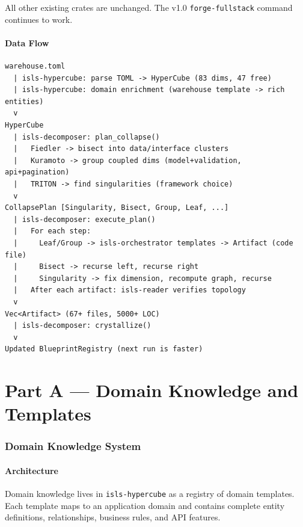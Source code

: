 \documentclass[11pt,a4paper]{article}
\begin{document}
All other existing crates are unchanged. The v1.0 \texttt{forge-fullstack}
command continues to work.

\subsection{Data Flow}

\begin{lstlisting}[title=End-to-End Flow]
warehouse.toml
  | isls-hypercube: parse TOML -> HyperCube (83 dims, 47 free)
  | isls-hypercube: domain enrichment (warehouse template -> rich entities)
  v
HyperCube
  | isls-decomposer: plan_collapse()
  |   Fiedler -> bisect into data/interface clusters
  |   Kuramoto -> group coupled dims (model+validation, api+pagination)
  |   TRITON -> find singularities (framework choice)
  v
CollapsePlan [Singularity, Bisect, Group, Leaf, ...]
  | isls-decomposer: execute_plan()
  |   For each step:
  |     Leaf/Group -> isls-orchestrator templates -> Artifact (code file)
  |     Bisect -> recurse left, recurse right
  |     Singularity -> fix dimension, recompute graph, recurse
  |   After each artifact: isls-reader verifies topology
  v
Vec<Artifact> (67+ files, 5000+ LOC)
  | isls-decomposer: crystallize()
  v
Updated BlueprintRegistry (next run is faster)
\end{lstlisting}

\part{Part A --- Domain Knowledge and Templates}

\section{Domain Knowledge System}

\subsection{Architecture}

Domain knowledge lives in \texttt{isls-hypercube} as a registry of
domain templates. Each template maps to an application domain and
contains complete entity definitions, relationships, business rules,
and API features.
\end{document}
